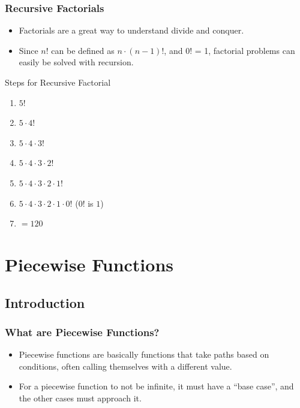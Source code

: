 \message{ !name(recursion.tex)}\documentclass[fleqn, t]{beamer}
\begin{document}
\begin{frame}
  \frametitle{Recursive Factorials}
  \begin{itemize}[<+->]
  \item Factorials are a great way to understand divide and conquer.  
  \item Since $n!$ can be defined as $n \cdot (n-1)!$, and $0!$ = 1, factorial
    problems can easily be solved with recursion. 
  \end{itemize}
  \begin{block}{Steps for Recursive Factorial}
    \begin{enumerate}[<+->]
    \item $5!$
    \item $5 \cdot 4!$
    \item $5 \cdot 4 \cdot 3!$ 
    \item $5 \cdot 4 \cdot 3 \cdot 2!$
    \item $5 \cdot 4 \cdot 3 \cdot 2 \cdot 1!$
    \item $5 \cdot 4 \cdot 3 \cdot 2 \cdot 1 \cdot 0!$ ($0!$ is $1$)
    \item $= 120$
    \end{enumerate}
  \end{block}
\end{frame}

\section{Piecewise Functions}
\subsection{Introduction}
\begin{frame}
  \frametitle{What are Piecewise Functions?}
  \begin{itemize}[<+->]
  \item Piecewise functions are basically functions that take paths based on
    conditions, often calling themselves with a different value. 
  \item For a piecewise function to not be infinite, it must have a ``base case'',
    and the other cases must approach it.
  \end{itemize}
\end{frame}
\end{document}
